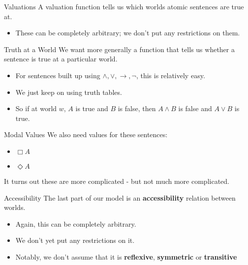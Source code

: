 \documentclass[
  14pt,
  letterpaper,
  ignorenonframetext,
  aspectratio=169,
  handout]{beamer}
\providecommand{\tightlist}{%
  \setlength{\itemsep}{0pt}\setlength{\parskip}{0pt}}\usepackage{longtable,booktabs,array}
\begin{document}
\begin{frame}{Valuations}
\protect\hypertarget{valuations}{}
A valuation function tells us which worlds atomic sentences are true at.

\begin{itemize}[<+->]
\tightlist
\item
  These can be completely arbitrary; we don't put any restrictions on
  them.
\end{itemize}
\end{frame}

\begin{frame}{Truth at a World}
\protect\hypertarget{truth-at-a-world}{}
We want more generally a function that tells us whether a sentence is
true at a particular world.

\begin{itemize}[<+->]
\tightlist
\item
  For sentences built up using \(\wedge, \vee, \rightarrow, \neg\), this
  is relatively easy.
\item
  We just keep on using truth tables.
\item
  So if at world \(w\), \(A\) is true and \(B\) is false, then
  \(A \wedge B\) is false and \(A \vee B\) is true.
\end{itemize}
\end{frame}

\begin{frame}{Modal Values}
\protect\hypertarget{modal-values}{}
We also need values for these sentences:

\begin{itemize}[<+->]
\tightlist
\item
  \(\Box A\)
\item
  \(\Diamond A\)
\end{itemize}

It turns out these are more complicated - but not much more complicated.
\end{frame}

\begin{frame}{Accessibility}
\protect\hypertarget{accessibility}{}
The last part of our model is an \textbf{accessibility} relation between
worlds.

\begin{itemize}[<+->]
\tightlist
\item
  Again, this can be completely arbitrary.
\item
  We don't yet put any restrictions on it.
\item
  Notably, we don't assume that it is \textbf{reflexive},
  \textbf{symmetric} or \textbf{transitive}
\end{itemize}
\end{frame}
\end{document}
